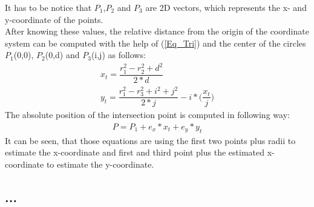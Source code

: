 It has to be notice that $P_1$,$P_2$  and $P_3$ are 2D vectors, which represents the x- and y-coordinate of the points.\\ 
After knowing these values, the relative distance from the origin of the coordinate system can be computed with the help of (\ref{Eq_Tri}) and the center of the circles $P_1$(0,0), $P_2$(0,d) and $P_3$(i,j) as follows:
\begin{align}
x_t = \dfrac{r_1^2 - r_2^2 + d^2}{2*d} \\
y_t = \dfrac{r_1^2 - r_3^2 + i^2 + j^2}{2*j} - i* \bigg(\dfrac{x_t}{j}\bigg) 
\end{align}
The absolute position of the intersection point is computed in following way:
\begin{align}
P = P_1 + e_x * x_t + e_y * y_t 
\end{align}
It can be seen, that those equations are using the first two points plus radii to estimate the x-coordinate and first and third point plus the estimated x-coordinate to estimate the y-coordinate.\\ 

\subsection{...}